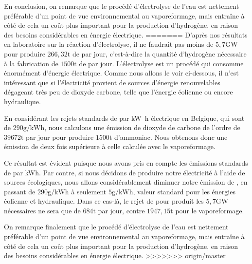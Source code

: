 \documentclass[a4paper, oneside, 12pt]{article}
\begin{document}
En conclusion, on remarque que le procédé d'électrolyse de l'eau est nettement préférable d'un point de vue environnemental au vaporeformage, mais entraîne à côté de cela un coût plus important pour la production d'hydrogène, en raison des besoins considérables en énergie électrique.
=======
D'après nos résultats en laboratoire sur la réaction d'électrolyse, 
il ne faudrait pas moins de $5,7 \si{\giga\watt}$ 
pour produire $266,32\si{\tonne}$ de  par jour, 
c'est-à-dire la quantité d'hydrogène nécessaire 
à la fabrication de $1500\si{\tonne}$ de  par jour. 
L'électrolyse est un procédé qui consomme énormément d'énergie électrique. 
Comme nous allons le voir ci-dessous, il n'est intéressant que si 
l'électricité provient de sources d'énergie renouvelables dégageant 
très peu de dioxyde carbone, telle que l'énergie éolienne ou encore hydraulique.

En considérant les rejets standards de  par \si{\kilo\watt\hour} électrique 
en Belgique, qui sont de $290\si{\gram/\kilo\watt\hour}$,
nous calculons une émission de dioxyde de carbone de l'ordre de $39 672\si{\tonne}$
par jour pour produire $1500\si{\tonne}$ d'ammoniac. 
Nous obtenons donc une émission de  deux fois 
supérieure à celle calculée avec le vaporeformage.

Ce résultat est évident puisque nous avons pris en compte 
les émissions standards de  par kWh.
Par contre, si nous décidons de produire notre électricité à l'aide de sources écologiques,
nous allons considérablement diminuer notre émission de , 
en passant de $290\si{\gram/\kilo\watt\hour}$ à seulement $5\si{\gram/\kilo\watt\hour}$, 
valeur standard pour les énergies éolienne et hydraulique. 
Dans ce cas-là, le rejet de  pour produit les $5,7\si{\giga\watt}$ nécessaires 
ne sera que de $684\si{\tonne}$ par jour, 
contre $1947,15\si{\tonne}$ pour le vaporeformage. 
\newline

On remarque finalement que le procédé d'électrolyse de l'eau 
est nettement préférable d'un point de vue environnemental au vaporeformage, 
mais entraîne à côté de cela un coût plus important pour la production d'hydrogène,
en raison des besoins considérables en énergie électrique.
>>>>>>> origin/master
\end{document}
